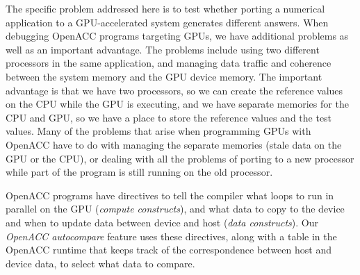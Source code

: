 The specific problem addressed here is to test whether porting a numerical application to a GPU-accelerated system generates different answers.
When debugging OpenACC programs targeting GPUs, we have additional problems as well as an important advantage.
The problems include using two different processors in the same application, and managing data traffic and coherence between the system memory and the GPU device memory.
The important advantage is that we have two processors, so we can create the reference values on the CPU while the GPU is executing, and we have separate memories for the CPU and GPU, so we have a place to store the reference values and the test values.
Many of the problems that arise when programming GPUs with OpenACC have to do with managing the separate memories (stale data on the GPU or the CPU), or dealing with all the problems of porting to a new processor while part of the program is still running on the old processor.

OpenACC programs have directives to tell the compiler what loops to run in parallel on the GPU (\emph{compute constructs}), and what data to copy to the device and when to update data between device and host (\emph{data constructs}).
Our \emph{OpenACC autocompare} feature uses these directives, along with a table in the OpenACC runtime that keeps track of the correspondence between host and device data, to select what data to compare.
